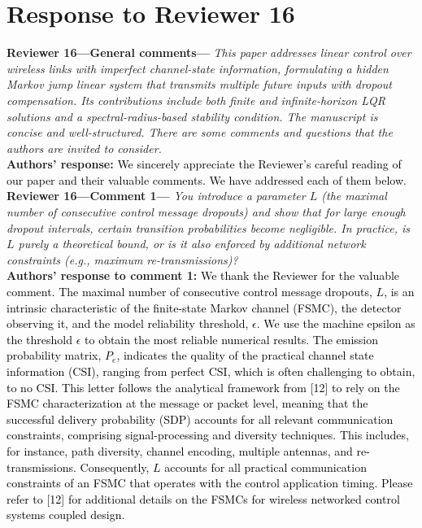 \section{Response to Reviewer 16}
\begin{bibunit}[alpha]
\textbf{Reviewer 16---General comments---}\textit{%
This paper addresses linear control over wireless links with imperfect channel-state information, formulating a hidden Markov jump linear system that transmits multiple future inputs with dropout compensation.
Its contributions include both finite and infinite-horizon LQR solutions and a spectral-radius-based stability condition. The manuscript is concise and well-structured. There are some comments and questions that the authors are invited to consider.}\\[2mm]
\textbf{Authors' response:} \textcolor{black}{We sincerely appreciate the Reviewer's careful reading of our paper and their valuable comments. We have addressed each of them below.}\\[4mm]
\textbf{Reviewer 16---Comment 1---}\textit{%
You introduce a parameter $L$ (the maximal number of consecutive control message dropouts) and show that for large enough dropout intervals, certain transition probabilities become negligible. 
In practice, is $L$ purely a theoretical bound, or is it also enforced by additional network constraints (e.g., maximum re-transmissions)?}\\[2mm]
\textbf{Authors' response to comment 1:} \textcolor{black}{We thank the Reviewer for the valuable comment. 
The maximal number of consecutive control message dropouts, $L$, is an intrinsic characteristic of the finite-state Markov channel (FSMC), the detector observing it, and the model reliability threshold, $\epsilon$. We use the machine epsilon as the threshold $\epsilon$ to obtain the most reliable numerical results. The emission probability matrix, $P_e$, indicates the quality of the practical channel state information (CSI), ranging from perfect CSI, which is often challenging to obtain, to no CSI. This letter follows the analytical framework from [12] to rely on the FSMC characterization at the message or packet level, meaning that the successful delivery probability (SDP) accounts for all relevant communication constraints, comprising signal-processing and diversity techniques. This includes, for instance, path diversity, channel encoding, multiple antennas, and re-transmissions. Consequently, $L$ accounts for all practical communication constraints of an FSMC that operates with the control application timing. Please refer to [12] for additional details on the FSMCs for wireless networked control systems coupled design.}\\[4mm]

\end{bibunit}
